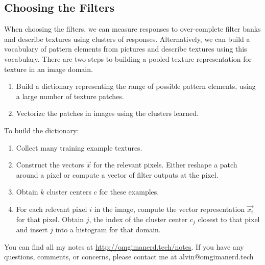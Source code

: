 \documentclass{math}
\begin{document}
\subsection*{Choosing the Filters}
When choosing the filters, we can measure responses to over-complete filter
banks and describe textures using clusters of responses. Alternatively, we can
build a vocabulary of pattern elements from pictures and describe textures using
this vocabulary. There are two steps to building a pooled texture representation
for texture in an image domain.
\begin{enumerate}
  \item Build a dictionary representing the range of possible pattern elements,
    using a large number of texture patches.
  \item Vectorize the patches in images using the clusters learned.
\end{enumerate}
To build the dictionary:
\begin{enumerate}
  \item Collect many training example textures.
  \item Construct the vectors \( \vec{x} \) for the relevant pixels. Either
    reshape a patch around a pixel or compute a vector of filter outputs
    at the pixel.
  \item Obtain \( k \) cluster centers \( c \) for these examples.
  \item For each relevant pixel \( i \) in the image, compute the vector
    representation \( \vec{x_i} \) for that pixel. Obtain \( j \), the index
    of the cluster center \( c_j \) closest to that pixel and insert \( j \)
    into a histogram for that domain.
\end{enumerate}


\begin{center}
  You can find all my notes at \url{http://omgimanerd.tech/notes}. If you have
  any questions, comments, or concerns, please contact me at
  alvin@omgimanerd.tech
\end{center}
\end{document}
